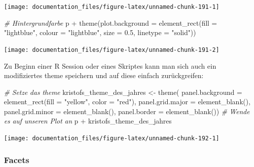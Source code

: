 \documentclass[
]{article}
\newenvironment{Shaded}{\begin{snugshade}}{\end{snugshade}}
\newcommand{\AttributeTok}[1]{\textcolor[rgb]{0.77,0.63,0.00}{#1}}
\newcommand{\CommentTok}[1]{\textcolor[rgb]{0.56,0.35,0.01}{\textit{#1}}}
\newcommand{\FloatTok}[1]{\textcolor[rgb]{0.00,0.00,0.81}{#1}}
\newcommand{\FunctionTok}[1]{\textcolor[rgb]{0.00,0.00,0.00}{#1}}
\newcommand{\NormalTok}[1]{#1}
\newcommand{\OtherTok}[1]{\textcolor[rgb]{0.56,0.35,0.01}{#1}}
\newcommand{\SpecialCharTok}[1]{\textcolor[rgb]{0.00,0.00,0.00}{#1}}
\newcommand{\StringTok}[1]{\textcolor[rgb]{0.31,0.60,0.02}{#1}}
\begin{document}
\begin{center}\texttt{[image: documentation\_files/figure-latex/unnamed-chunk-191-1]} \end{center}

\begin{Shaded}
\begin{Highlighting}[]

\CommentTok{\# Hintergrundfarbe }
\NormalTok{p }\SpecialCharTok{+} \FunctionTok{theme}\NormalTok{(}\AttributeTok{plot.background =} \FunctionTok{element\_rect}\NormalTok{(}\AttributeTok{fill =} \StringTok{"lightblue"}\NormalTok{,}
                                \AttributeTok{colour =} \StringTok{"lightblue"}\NormalTok{,}
                                \AttributeTok{size =} \FloatTok{0.5}\NormalTok{, }\AttributeTok{linetype =} \StringTok{"solid"}\NormalTok{))}
\end{Highlighting}
\end{Shaded}

\begin{center}\texttt{[image: documentation\_files/figure-latex/unnamed-chunk-191-2]} \end{center}

Zu Beginn einer R Session oder eines Skriptes kann man sich auch ein modifiziertes theme speichern und auf diese einfach zurückgreifen:

\begin{Shaded}
\begin{Highlighting}[]
\CommentTok{\# Setze das theme}
\NormalTok{kristofs\_theme\_des\_jahres }\OtherTok{\textless{}{-}} \FunctionTok{theme}\NormalTok{(}
  \AttributeTok{panel.background =} \FunctionTok{element\_rect}\NormalTok{(}\AttributeTok{fill =} \StringTok{"yellow"}\NormalTok{, }\AttributeTok{color =} \StringTok{"red"}\NormalTok{),}
  \AttributeTok{panel.grid.major =} \FunctionTok{element\_blank}\NormalTok{(), }
  \AttributeTok{panel.grid.minor =} \FunctionTok{element\_blank}\NormalTok{(), }
  \AttributeTok{panel.border =} \FunctionTok{element\_blank}\NormalTok{())}
\CommentTok{\# Wende es auf unseren Plot an}
\NormalTok{p }\SpecialCharTok{+}\NormalTok{ kristofs\_theme\_des\_jahres}
\end{Highlighting}
\end{Shaded}

\begin{center}\texttt{[image: documentation\_files/figure-latex/unnamed-chunk-192-1]} \end{center}

\hypertarget{facets}{%
\subsubsection{Facets}\label{facets}}
\end{document}
